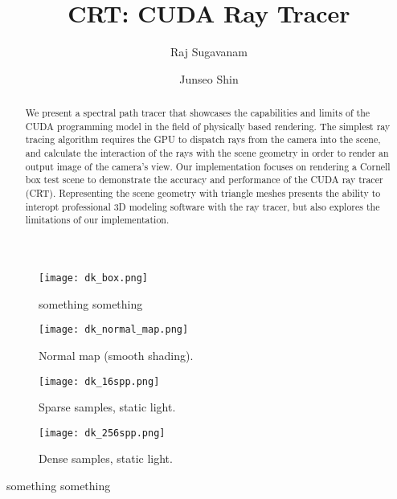 \documentclass[sigconf, screen]{acmart}
\begin{document}
\title{CRT: CUDA Ray Tracer}

\author{Raj Sugavanam}
\author{Junseo Shin}

\begin{abstract}
    We present a spectral path tracer that showcases the capabilities and limits of the CUDA
    programming model in the field of physically based rendering. The simplest ray tracing
    algorithm requires the GPU to dispatch rays from the camera into the scene, and
    calculate the interaction of the rays with the scene geometry in order to render an output
    image of the camera's view. Our implementation focuses on rendering a Cornell box test scene
    to demonstrate the accuracy and performance of the CUDA ray tracer (CRT). Representing the
    scene geometry with triangle meshes presents the ability to interopt professional 3D modeling
    software with the ray tracer, but also explores the limitations of our implementation.
\end{abstract}

\begin{teaserfigure}
    \centering
    \begin{subfigure}{0.24\textwidth}
        \centering
        \texttt{[image: dk\_box.png]}
        \caption{something something}
        \label{fig:teaser1}
    \end{subfigure}
    \begin{subfigure}{0.24\textwidth}
        \centering
        \texttt{[image: dk\_normal\_map.png]}
        \caption{Normal map (smooth shading).}
        \label{fig:teaser2}
    \end{subfigure}
    \begin{subfigure}{0.24\textwidth}
        \centering
        \texttt{[image: dk\_16spp.png]}
        \caption{Sparse samples, static light.}
        \label{fig:teaser3}
    \end{subfigure}
    \begin{subfigure}{0.24\textwidth}
        \centering
        \texttt{[image: dk\_256spp.png]}
        \caption{Dense samples, static light.}
        \label{fig:teaser4}
    \end{subfigure}
    \caption{something something}
    \label{fig:teaser}
\end{teaserfigure}
\end{document}
